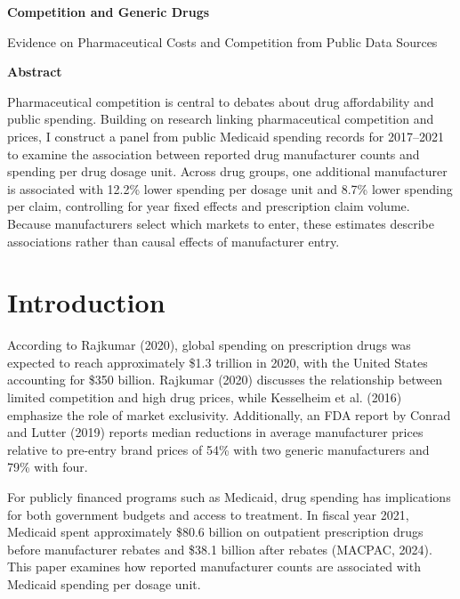
\begin{center}
    \Large
    \textbf{Competition and Generic Drugs}
        
    \vspace{0.4cm}
    \large
    Evidence on Pharmaceutical Costs and Competition from Public Data Sources
        
       
    \vspace{0.9cm}
    \textbf{Abstract}
    
\end{center}

Pharmaceutical competition is central to debates about drug affordability and public spending. Building on research linking pharmaceutical competition and prices, I construct a panel from public Medicaid spending records for 2017--2021 to examine the association between reported drug manufacturer counts and spending per drug dosage unit. Across drug groups, one additional manufacturer is associated with 12.2\% lower spending per dosage unit and 8.7\% lower spending per claim, controlling for year fixed effects and prescription claim volume. Because manufacturers select which markets to enter, these estimates describe associations rather than causal effects of manufacturer entry.

\section{Introduction}
According to Rajkumar (2020), global spending on prescription drugs was expected to reach approximately \$1.3 trillion in 2020, with the United States accounting for \$350 billion. Rajkumar (2020) discusses the relationship between limited competition and high drug prices, while Kesselheim et al. (2016) emphasize the role of market exclusivity. Additionally, an FDA report by Conrad and Lutter (2019) reports median reductions in average manufacturer prices relative to pre-entry brand prices of 54\% with two generic manufacturers and 79\% with four.

For publicly financed programs such as Medicaid, drug spending has implications for both government budgets and access to treatment. In fiscal year 2021, Medicaid spent approximately \$80.6 billion on outpatient prescription drugs before manufacturer rebates and \$38.1 billion after rebates (MACPAC, 2024). This paper examines how reported manufacturer counts are associated with Medicaid spending per dosage unit.

